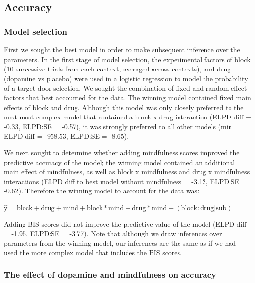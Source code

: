 \documentclass{article}
\begin{document}
\hypertarget{accuracy-1}{%
\subsection{Accuracy}\label{accuracy-1}}

\hypertarget{model-selection}{%
\subsubsection{Model selection}\label{model-selection}}

First we sought the best model in order to make subsequent inference
over the parameters. In the first stage of model selection, the
experimental factors of block (10 successive trials from each context,
averaged across contexts), and drug (dopamine vs placebo) were used in a
logistic regression to model the probability of a target door selection.
We sought the combination of fixed and random effect factors that best
accounted for the data. The winning model contained fixed main effects
of block and drug. Although this model was only closely preferred to the
next most complex model that contained a block x drug interaction (ELPD
diff = -0.33, ELPD:SE = -0.57), it was strongly preferred to all other
models (min ELPD diff = -958.53, ELPD:SE = -8.65).

We next sought to determine whether adding mindfulness scores improved
the predictive accuracy of the model; the winning model contained an
additional main effect of mindfulness, as well as block x mindfulness
and drug x mindfulness interactions (ELPD diff to best model without
mindfulness = -3.12, ELPD:SE = -0.62). Therefore the winning model to
account for the data was:

\(\mathrm{\hat{y}} = \mathrm{block} + \mathrm{drug} + \mathrm{mind} + \mathrm{block*mind} + \mathrm{drug*mind} + \mathrm{(block:drug|sub)}\)

Adding BIS scores did not improve the predictive value of the model
(ELPD diff = -1.95, ELPD:SE = -3.77). Note that although we draw
inferences over parameters from the winning model, our inferences are
the same as if we had used the more complex model that includes the BIS
scores.

\hypertarget{the-effect-of-dopamine-and-mindfulness-on-accuracy}{%
\subsubsection{The effect of dopamine and mindfulness on
accuracy}\label{the-effect-of-dopamine-and-mindfulness-on-accuracy}}
\end{document}
